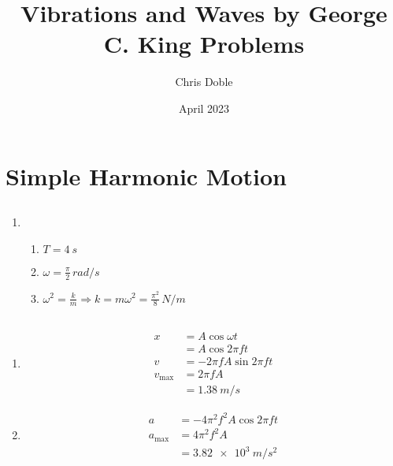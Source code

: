\documentclass{article}
\title{Vibrations and Waves by George C. King Problems}
\author{Chris Doble}
\date{April 2023}
\begin{document}
\maketitle

\tableofcontents

\section{Simple Harmonic Motion}

\subsection{}

\begin{enumerate}
  \item

        \begin{enumerate}
          \item $T = \qty{4}{s}$

          \item $\omega = \frac{\pi}{2} \,\unit{rad/s}$

          \item $\omega^2 = \frac{k}{m} \Rightarrow k = m \omega^2 = \frac{\pi^2}{8} \,\unit{N/m}$
        \end{enumerate}
\end{enumerate}

\subsection{}

\begin{enumerate}
  \item

        \begin{align*}
          x            & = A \cos \omega t           \\
                       & = A \cos 2 \pi f t          \\
          v            & = -2 \pi f A \sin 2 \pi f t \\
          v_\text{max} & = 2 \pi f A                 \\
                       & = \qty{1.38}{m/s}
        \end{align*}

  \item

        \begin{align*}
          a            & = -4 \pi^2 f^2 A \cos 2 \pi f t \\
          a_\text{max} & = 4 \pi^2 f^2 A                 \\
                       & = \qty{3.82e3}{m/s^2}
        \end{align*}
\end{enumerate}
\end{document}
